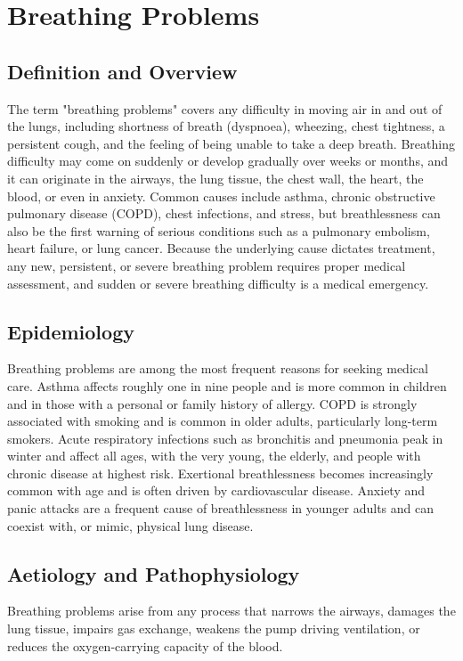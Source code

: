 \chapter{Breathing Problems}

\section*{Definition and Overview}
The term "breathing problems" covers any difficulty in moving air in and out of the lungs, including shortness of breath (dyspnoea), wheezing, chest tightness, a persistent cough, and the feeling of being unable to take a deep breath. Breathing difficulty may come on suddenly or develop gradually over weeks or months, and it can originate in the airways, the lung tissue, the chest wall, the heart, the blood, or even in anxiety. Common causes include asthma, chronic obstructive pulmonary disease (COPD), chest infections, and stress, but breathlessness can also be the first warning of serious conditions such as a pulmonary embolism, heart failure, or lung cancer. Because the underlying cause dictates treatment, any new, persistent, or severe breathing problem requires proper medical assessment, and sudden or severe breathing difficulty is a medical emergency.

\section*{Epidemiology}
Breathing problems are among the most frequent reasons for seeking medical care. Asthma affects roughly one in nine people and is more common in children and in those with a personal or family history of allergy. COPD is strongly associated with smoking and is common in older adults, particularly long-term smokers. Acute respiratory infections such as bronchitis and pneumonia peak in winter and affect all ages, with the very young, the elderly, and people with chronic disease at highest risk. Exertional breathlessness becomes increasingly common with age and is often driven by cardiovascular disease. Anxiety and panic attacks are a frequent cause of breathlessness in younger adults and can coexist with, or mimic, physical lung disease.

\section*{Aetiology and Pathophysiology}
Breathing problems arise from any process that narrows the airways, damages the lung tissue, impairs gas exchange, weakens the pump driving ventilation, or reduces the oxygen-carrying capacity of the blood.

